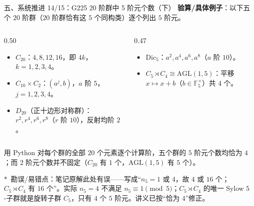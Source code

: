 \documentclass[aspectratio=169,10pt,fontset=none]{ctexbeamer}
\newcommand{\key}[1]{\textcolor{ink}{\bfseries #1}}
\newcommand{\starpt}{\textcolor{accent}{\bfseries$\ast$}}
\begin{document}
\begin{frame}[t]{五、系统推进 14/15：G225 20 阶群中 5 阶元个数（下）}
\scriptsize
\key{验算/具体例子}：以下五个 $20$ 阶群（$20$ 阶群恰有这 $5$ 个同构类）逐个列出 $5$ 阶元。
\begin{columns}[T]
\begin{column}{0.50\textwidth}
\begin{itemize}
  \item $C_{20}$：$4,8,12,16$，即 $4k$，$k=1,2,3,4$。
  \item $C_{10}\times C_2$：$(a^j,b)$，$a$ 阶 $5$，$j=1,2,3,4$。
  \item $D_{20}$（正十边形对称群）：$r^2,r^4,r^6,r^8$（$r$ 阶 $10$），反射均阶 $2$。
\end{itemize}
\end{column}
\begin{column}{0.47\textwidth}
\begin{itemize}
  \item $\mathrm{Dic}_5$：$a^2,a^4,a^6,a^8$（$a$ 阶 $10$）。
  \item $C_5\rtimes C_4\cong\mathrm{AGL}(1,5)$：平移 $x\mapsto x+b$（$b\in\mathbb F_5^\times$）共 $4$ 个。
\end{itemize}
\end{column}
\end{columns}
用 Python 对每个群的全部 $20$ 个元素逐个计算阶，五个群的 $5$ 阶元个数均恰为 $4$；而 $2$ 阶元个数并不固定（$C_{20}$ 有 $1$ 个，$\mathrm{AGL}(1,5)$ 有 $5$ 个）。

\starpt~勘误/易错点：笔记原解此处有误——写成“$n_5=1$ 或 $4$，故 $4$ 或 $16$ 个；$C_5\rtimes C_4$ 有 $16$ 个”。实际 $n_5=4$ 不满足 $n_5\equiv1\pmod5$；$C_5\rtimes C_4$ 的唯一 Sylow $5$-子群就是旋转子群 $C_5$，只有 $4$ 个 $5$ 阶元。讲义已按“恰为 $4$”修正。
\end{frame}
\end{document}
